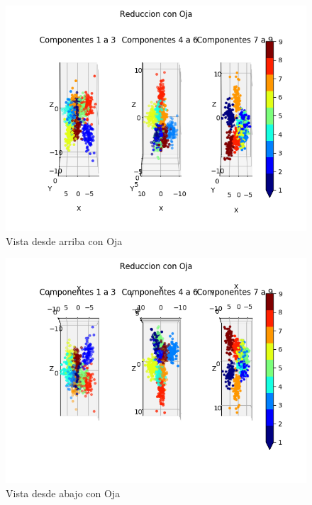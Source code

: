 \begin{figure}[H]
  \includegraphics[width=160mm]{imagenes/componentes_oja_1.png}
  \caption{Vista desde arriba con Oja}
\end{figure}

\begin{figure}[H]
  \includegraphics[width=160mm]{imagenes/componentes_oja_2.png}
  \caption{Vista desde abajo con Oja}
\end{figure}


